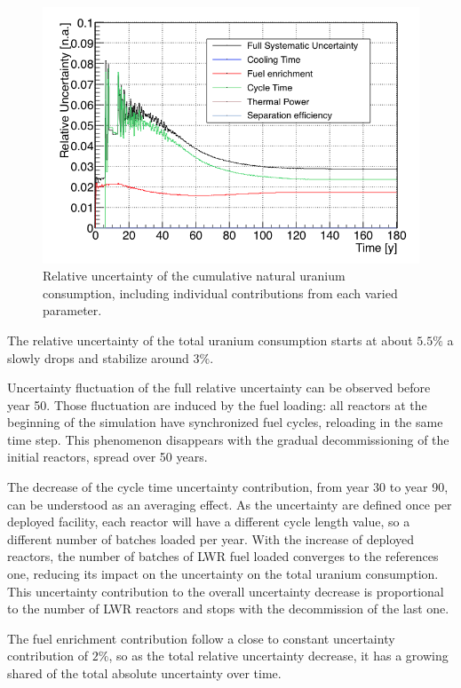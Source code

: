\documentclass{anstrans}
\begin{document}
\begin{figure}[t] %
    \centering
    \includegraphics[scale=0.3]{unat_uncer}
    \caption{Relative uncertainty of the cumulative natural uranium consumption, including
      individual contributions from each varied parameter.}\label{fig:unatr_uncer}
\end{figure}
The relative uncertainty of the total uranium consumption starts at about
$5.5\%$ a slowly drops and stabilize around $3\%$.

Uncertainty fluctuation of the full relative uncertainty can be observed before
year 50.  Those fluctuation are induced by the fuel loading: all reactors at the
beginning of the simulation have synchronized fuel cycles, reloading in the same time step.
This phenomenon disappears
with the gradual decommissioning of the initial reactors, spread over 50 years.

The decrease of the cycle time uncertainty contribution, from year 30 to year
90, can be understood as an averaging effect.  As the uncertainty are defined once
per deployed facility, each reactor will have a different cycle
length value, so a different number of batches loaded per year.  With the increase
of deployed reactors, the number of batches of \gls{LWR} fuel loaded converges
to the references one, reducing its impact on the uncertainty on the total
uranium consumption. This uncertainty contribution to the overall uncertainty
decrease is proportional to the number of \gls{LWR} reactors and stops with the
decommission of the last one.

The fuel enrichment contribution follow a close to constant uncertainty
contribution of $2\%$, so as the total relative uncertainty decrease, it
has a growing shared of the total absolute uncertainty over time.
\end{document}
